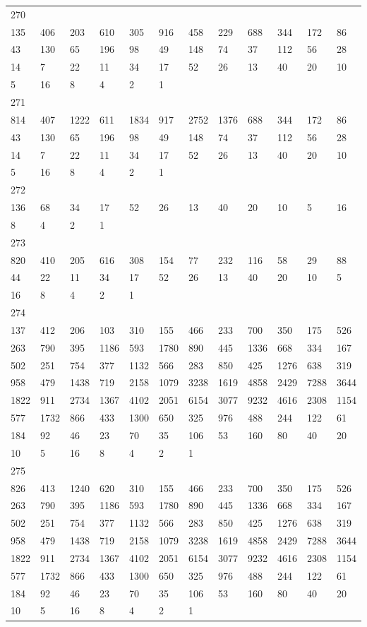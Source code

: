 \begin{longtable}{llllllllllll}
270&&&&&&&&&&&\\
135& 406& 203& 610& 305& 916& 458& 229& 688& 344& 172& 86\\
43& 130& 65& 196& 98& 49& 148& 74& 37& 112& 56& 28\\
14& 7& 22& 11& 34& 17& 52& 26& 13& 40& 20& 10\\
5& 16& 8& 4& 2& 1& \\

271&&&&&&&&&&&\\
814& 407& 1222& 611& 1834& 917& 2752& 1376& 688& 344& 172& 86\\
43& 130& 65& 196& 98& 49& 148& 74& 37& 112& 56& 28\\
14& 7& 22& 11& 34& 17& 52& 26& 13& 40& 20& 10\\
5& 16& 8& 4& 2& 1& \\

272&&&&&&&&&&&\\
136& 68& 34& 17& 52& 26& 13& 40& 20& 10& 5& 16\\
8& 4& 2& 1& \\

273&&&&&&&&&&&\\
820& 410& 205& 616& 308& 154& 77& 232& 116& 58& 29& 88\\
44& 22& 11& 34& 17& 52& 26& 13& 40& 20& 10& 5\\
16& 8& 4& 2& 1& \\

274&&&&&&&&&&&\\
137& 412& 206& 103& 310& 155& 466& 233& 700& 350& 175& 526\\
263& 790& 395& 1186& 593& 1780& 890& 445& 1336& 668& 334& 167\\
502& 251& 754& 377& 1132& 566& 283& 850& 425& 1276& 638& 319\\
958& 479& 1438& 719& 2158& 1079& 3238& 1619& 4858& 2429& 7288& 3644\\
1822& 911& 2734& 1367& 4102& 2051& 6154& 3077& 9232& 4616& 2308& 1154\\
577& 1732& 866& 433& 1300& 650& 325& 976& 488& 244& 122& 61\\
184& 92& 46& 23& 70& 35& 106& 53& 160& 80& 40& 20\\
10& 5& 16& 8& 4& 2& 1& \\

275&&&&&&&&&&&\\
826& 413& 1240& 620& 310& 155& 466& 233& 700& 350& 175& 526\\
263& 790& 395& 1186& 593& 1780& 890& 445& 1336& 668& 334& 167\\
502& 251& 754& 377& 1132& 566& 283& 850& 425& 1276& 638& 319\\
958& 479& 1438& 719& 2158& 1079& 3238& 1619& 4858& 2429& 7288& 3644\\
1822& 911& 2734& 1367& 4102& 2051& 6154& 3077& 9232& 4616& 2308& 1154\\
577& 1732& 866& 433& 1300& 650& 325& 976& 488& 244& 122& 61\\
184& 92& 46& 23& 70& 35& 106& 53& 160& 80& 40& 20\\
10& 5& 16& 8& 4& 2& 1& \\


\end{longtable}

